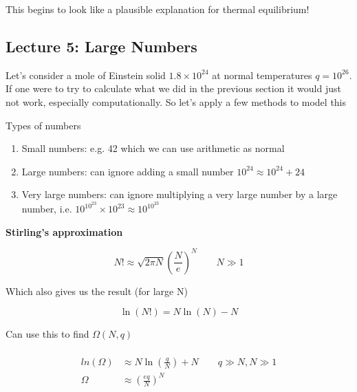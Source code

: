 \documentclass[10pt]{article}
\begin{document}
\begin{blockquote}
	This begins to look like a plausible explanation for thermal equilibrium!
\end{blockquote}





\subsection{Lecture 5: Large Numbers}

Let's consider a mole of Einstein solid $ 1.8 \times 10^{24} $  at normal temperatures $ q = 10^{26} $. 
If one were to try to calculate what we did in the previous section it would just not work, especially computationally.
So let's apply a few methods to model this 


Types of numbers
\begin{enumerate}
	\item Small numbers: e.g. 42 which we can use arithmetic as normal
	\item Large numbers: can ignore adding a small number $ 10^{24} \approx 10^{24} + 24$  
	\item Very large numbers: can ignore multiplying a very large number by a large number, i.e. $ 10^{10^{23}} \times 10^{23} \approx 10^{10^{23}} $ 
\end{enumerate}


\begin{theorem}

	\textbf{ Stirling's approximation }


	\begin{equation}
		N! \approx \sqrt{2\pi N}  (\frac{N}{e})^N \qquad N \gg 1
		\label{eq:294:stirlings_approx}
	\end{equation}

	Which also gives us the result (for large N)

	\begin{equation}
		\ln(N!) = N \ln(N) - N
	\end{equation}

\end{theorem}


Can use this to find $ \Omega(N, q) $ 

\begin{equation}
	\begin{split}
		\\ln(\Omega) &\approx N \ln (\frac{q}{N}) + N \qquad q \gg N, N \gg 1 \\
		\Omega &\approx \left(\frac{eq}{N}\right)^N  \\
	\end{split}
\end{equation}
\end{document}
